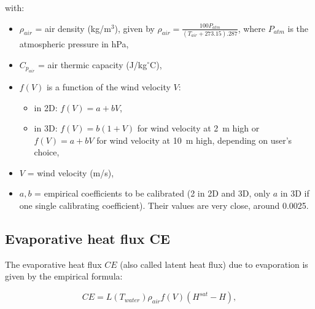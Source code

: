 with:
\begin{itemize}
  \item $\rho_{air}$ = air density (kg/m$^3$),
    given by $\rho_{air} = \frac{100 P_{atm}}{(T_{air} + 273.15).287}$,
    where $P_{atm}$ is the atmospheric pressure in hPa,
  \item $C_{p_{air}}$ = air thermic capacity (J/kg$^{\circ}$C),
  \item $f(V)$ is a function of the wind velocity $V$:
    \begin{itemize}
    \item in 2D: $f(V) = a+bV$,
    \item in 3D: $f(V) = b(1+V)$ for wind velocity at 2~m high
      or $f(V) = a+bV$ for wind velocity at 10~m high,
      depending on user's choice,
    \end{itemize}
  \item $V$ = wind velocity (m/s),
  \item $a, b$ = empirical coefficients
    to be calibrated (2 in 2D and 3D, only $a$ in 3D if one single calibrating coefficient).
    Their values are very close, around 0.0025.
\end{itemize}

\subsection{Evaporative heat flux CE}

The evaporative heat flux $CE$ (also called latent heat flux)
due to evaporation is given by the empirical formula:

\begin{equation}
  CE = L(T_{water}) \rho_{air} f(V) (H^{sat} - H),
\end{equation}

